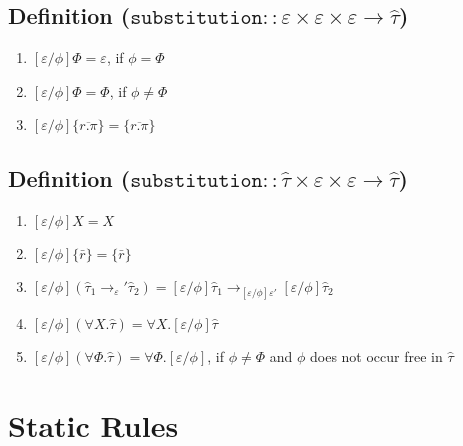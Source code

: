 \documentclass{llncs}
\newcommand{\keywadj}[1]{\mathtt{#1}}
\newcommand{\kwa}[1]{\keywadj{ #1 }}
\begin{document}
\subsection*{Definition ($\kwa{substitution :: \varepsilon \times \varepsilon \times \varepsilon \rightarrow \hat \tau}$)}

\begin{enumerate}
	\item $[\varepsilon/\phi]\Phi = \varepsilon$, if $\phi = \Phi$
	\item $[\varepsilon/\phi]\Phi = \Phi$, if $\phi \neq \Phi$
	\item $[\varepsilon/\phi]\{ \overline{r.\pi} \} = \{ \overline{r.\pi} \}$
\end{enumerate}

\subsection*{Definition ($\kwa{substitution :: \hat \tau \times \varepsilon \times \varepsilon \rightarrow \hat \tau}$)}

\begin{enumerate}
	\item $[\varepsilon/\phi]X = X$
	\item $[\varepsilon/\phi]\{ \bar r \} = \{ \bar r \}$
	\item $[\varepsilon/\phi](\hat \tau_1 \rightarrow_\varepsilon' \hat \tau_2) = [\varepsilon/\phi]\hat \tau_1 \rightarrow_{[\varepsilon/\phi]\varepsilon'} [\varepsilon/\phi]\hat \tau_2$
	\item $[\varepsilon/\phi](\forall X. \hat \tau) = \forall X. [\varepsilon/\phi]\hat \tau$
	\item $[\varepsilon/\phi](\forall \Phi. \hat \tau) = \forall \Phi. [\varepsilon/\phi]$, if $\phi \neq \Phi$ and $\phi$ does not occur free in $\hat \tau$
\end{enumerate}

\section{Static Rules}

\end{document}
